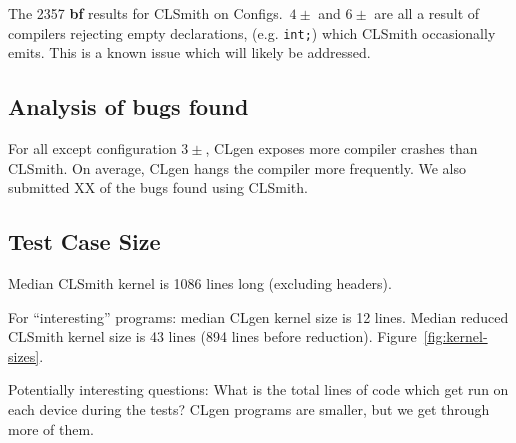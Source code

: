 

The 2357 \textbf{bf} results for CLSmith on Configs.\ $4\pm$ and $6\pm$ are all a result of compilers rejecting empty declarations, (e.g. \texttt{int;}) which CLSmith occasionally emits. This is a known issue which will likely be addressed.


\subsection{Analysis of bugs found}

For all except configuration $3\pm$, CLgen exposes more compiler crashes than CLSmith. On average, CLgen hangs the compiler more frequently. We also submitted XX of the bugs found using CLSmith.


\subsection{Test Case Size}

Median CLSmith kernel is 1086 lines long (excluding headers).

For ``interesting'' programs: median CLgen kernel size is 12 lines. Median reduced CLSmith kernel size is 43 lines (894 lines before reduction). Figure~\ref{fig:kernel-sizes}.

Potentially interesting questions: What is the total lines of code which get run on each device during the tests? CLgen programs are smaller, but we get through more of them.



